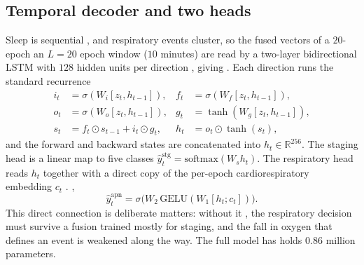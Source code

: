 \documentclass[preprint,12pt]{elsarticle}
\providecommand{\DIFaddtex}[1]{{\protect\color{blue} \sf #1}} %
\providecommand{\DIFdeltex}[1]{{\protect\color{red} \scriptsize #1}} %
\providecommand{\DIFaddbegin}{} %
\providecommand{\DIFaddend}{} %
\providecommand{\DIFdelbegin}{} %
\providecommand{\DIFdelend}{} %
\providecommand{\DIFadd}[1]{\texorpdfstring{\DIFaddtex{#1}}{#1}} %
\providecommand{\DIFdel}[1]{\texorpdfstring{\DIFdeltex{#1}}{}} %
\providecommand{\DIFscaledelfig}{0.5}
\newlength{\DIFdelgraphicswidth} %
\newlength{\DIFdelgraphicsheight} %
\providecommand{\DIFaddincludegraphics}[2][]{{\color{blue}\fbox{\DIFOincludegraphics[#1]{#2}}}} %
\providecommand{\DIFdelincludegraphics}[2][]{%
\sbox{\DIFdelgraphicsbox}{\DIFOincludegraphics[#1]{#2}}%
\settoboxwidth{\DIFdelgraphicswidth}{\DIFdelgraphicsbox} %
\settoboxtotalheight{\DIFdelgraphicsheight}{\DIFdelgraphicsbox} %
\scalebox{\DIFscaledelfig}{%
\parbox[b]{\DIFdelgraphicswidth}{\usebox{\DIFdelgraphicsbox}\\[-\baselineskip] \rule{\DIFdelgraphicswidth}{0em}}\llap{\resizebox{\DIFdelgraphicswidth}{\DIFdelgraphicsheight}{%
\setlength{\unitlength}{\DIFdelgraphicswidth}%
\begin{picture}(1,1)%
\thicklines\linethickness{2pt} %
{\color[rgb]{1,0,0}\put(0,0){\framebox(1,1){}}}%
{\color[rgb]{1,0,0}\put(0,0){\line( 1,1){1}}}%
{\color[rgb]{1,0,0}\put(0,1){\line(1,-1){1}}}%
\end{picture}%
}\hspace*{3pt}}} %
} %
\DeclareRobustCommand{\DIFaddbegin}{\DIFOaddbegin \let\includegraphics\DIFaddincludegraphics} %
\DeclareRobustCommand{\DIFaddend}{\DIFOaddend \let\includegraphics\DIFOincludegraphics} %
\DeclareRobustCommand{\DIFdelbegin}{\DIFOdelbegin \let\includegraphics\DIFdelincludegraphics} %
\DeclareRobustCommand{\DIFdelend}{\DIFOaddend \let\includegraphics\DIFOincludegraphics} %
\begin{document}
\subsection{Temporal decoder and two heads}
Sleep is sequential \DIFdelbegin \DIFdel{, }\DIFdelend and respiratory events cluster, so the fused vectors of \DIFdelbegin \DIFdel{a $20$-epoch
}\DIFdelend \DIFaddbegin \DIFadd{an $L=20$ epoch
}\DIFaddend window ($10$ minutes) are read by a two-layer bidirectional LSTM\DIFdelbegin \DIFdel{with $128$ hidden units per
direction , giving }\DIFdelend \DIFaddbegin \DIFadd{. Each direction runs the
standard recurrence
}\begin{align}
i_t&=\sigma(W_i[z_t,h_{t-1}]), & f_t&=\sigma(W_f[z_t,h_{t-1}]),\nonumber\\
o_t&=\sigma(W_o[z_t,h_{t-1}]), & g_t&=\tanh(W_g[z_t,h_{t-1}]),\\
s_t&=f_t\odot s_{t-1}+i_t\odot g_t, & h_t&=o_t\odot\tanh(s_t),\nonumber
\end{align}
\DIFadd{and the forward and backward states are concatenated into }\DIFaddend $h_t\in\mathbb{R}^{256}$. The
staging head is a linear map \DIFdelbegin \DIFdel{to five classes}\DIFdelend \DIFaddbegin \DIFadd{$\hat y^{\mathrm{stg}}_t=\mathrm{softmax}(W_s h_t)$}\DIFaddend . The
respiratory head reads $h_t$ together with a direct copy of the per-epoch cardiorespiratory
embedding $c_t$\DIFdelbegin \DIFdel{. }\DIFdelend \DIFaddbegin \DIFadd{,
}\begin{equation}
\hat y^{\mathrm{apn}}_t=\sigma\!\big(W_2\,\mathrm{GELU}(W_1[h_t;c_t])\big).
\end{equation}
\DIFaddend This direct connection \DIFdelbegin \DIFdel{is deliberate}\DIFdelend \DIFaddbegin \DIFadd{matters}\DIFaddend : without it \DIFdelbegin \DIFdel{, }\DIFdelend the respiratory decision must survive a fusion
trained mostly for staging, and the fall in oxygen that defines an event is weakened along the
way. The full model \DIFdelbegin \DIFdel{has }\DIFdelend \DIFaddbegin \DIFadd{holds }\DIFaddend $0.86$ million parameters.
\end{document}

